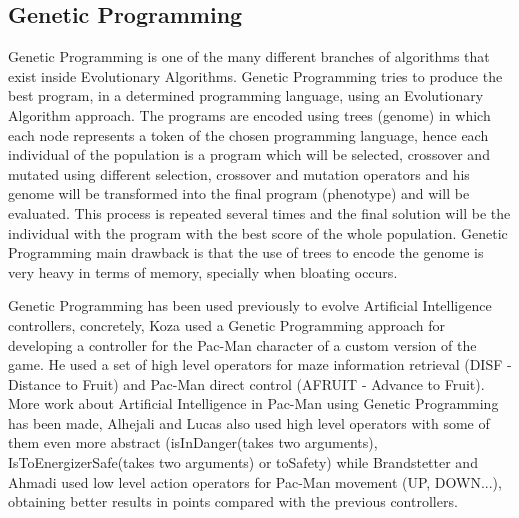 \documentclass{llncs}
\begin{document}
\subsection{Genetic Programming}
Genetic Programming is one of the many different branches of algorithms that exist inside Evolutionary Algorithms.
Genetic Programming tries to produce the best program, in a determined programming language, using an Evolutionary Algorithm approach. The programs are encoded using trees (genome)  in which each node represents a token of the chosen programming language, hence each individual of the population is a program which will be selected, crossover and mutated using different selection, crossover and mutation operators and his genome will be transformed into the final program (phenotype) and will be evaluated. This process is repeated several times and the final solution will be the individual with the program with the best score of the whole population.
Genetic Programming main drawback is that the use of trees to encode the genome is very heavy in terms of memory, specially when bloating occurs.  

Genetic Programming has been used previously to evolve Artificial Intelligence controllers, concretely, Koza 
used a Genetic Programming approach for developing a controller for the Pac-Man character of a custom version of the game. He used a set of high level operators for maze information retrieval (DISF - Distance to Fruit) and Pac-Man direct control (AFRUIT - Advance to Fruit). %
More work about Artificial Intelligence in Pac-Man using Genetic Programming has been made, Alhejali and Lucas 
also used high level operators with some of them even more abstract (isInDanger(takes two arguments), IsToEnergizerSafe(takes two arguments) or toSafety) while Brandstetter and Ahmadi 
used low level action operators for Pac-Man movement (UP, DOWN...), obtaining better results in points compared with the previous controllers.
\end{document}
